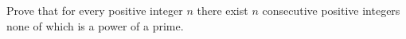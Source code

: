 Prove that for every positive integer $n$ there exist $n$ consecutive positive integers none of which is a power of a prime.
